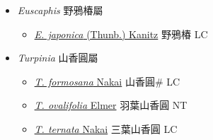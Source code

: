 
  \begin{itemize}
 \item[] \textit{Euscaphis} 野鴉椿屬
                    
  \begin{itemize}
        \item[] \href{http://www.theplantlist.org/tpl1.1/search?q=Euscaphis+japonica}{\textit{E. japonica} (Thunb.) Kanitz}   野鴉椿 LC
  \end{itemize}
 \item[] \textit{Turpinia} 山香圓屬
                    
  \begin{itemize}
        \item[] \href{http://www.theplantlist.org/tpl1.1/search?q=Turpinia+formosana}{\textit{T. formosana} Nakai}   山香圓\# LC
        \item[] \href{http://www.theplantlist.org/tpl1.1/search?q=Turpinia+ovalifolia}{\textit{T. ovalifolia} Elmer}   羽葉山香圓 NT
        \item[] \href{http://www.theplantlist.org/tpl1.1/search?q=Turpinia+ternata}{\textit{T. ternata} Nakai}   三葉山香圓 LC
  \end{itemize}
  \end{itemize}
